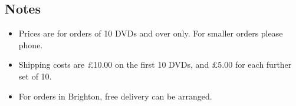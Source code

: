 \bigskip

\subsection*{Notes}
\begin{itemize}
\item Prices are for orders of 10 DVDs and over only. For smaller orders please phone.
\item Shipping costs are \pounds 10.00 on the first 10 DVDs, and \pounds 5.00 for each further set of 10.
\item For orders in Brighton, free delivery can be arranged.
\end{itemize}






